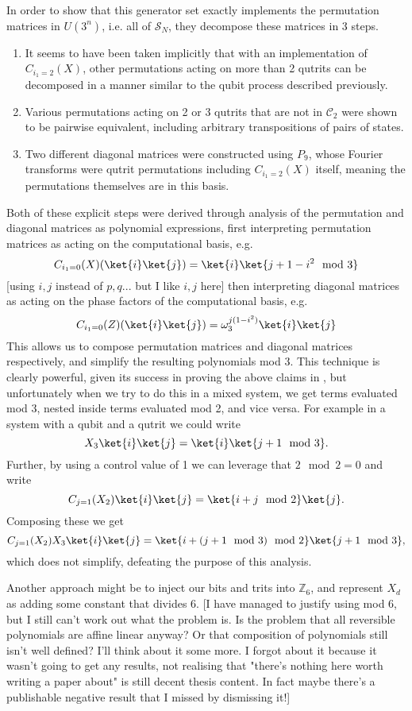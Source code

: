 In order to show that this generator set exactly implements the permutation matrices in $U\left(3^n\right)$, i.e. all of $\mathcal{S}_{N}$, they decompose these matrices in 3 steps.
\begin{enumerate}
	\item It seems to have been taken implicitly that with an implementation of $C_{i_1 = 2}(X)$, other permutations acting on more than 2 qutrits can be decomposed in a manner similar to the qubit process described previously.
	\item Various permutations acting on 2 or 3 qutrits that are not in $\mathcal{C}_2$ were shown to be pairwise equivalent, including arbitrary transpositions of pairs of states.
	\item Two different diagonal matrices were constructed using $P_9$, whose Fourier transforms were qutrit permutations including $C_{i_1=2}(X)$ itself, meaning the permutations themselves are in this basis.
\end{enumerate}

Both of these explicit steps were derived through analysis of the permutation and diagonal matrices as polynomial expressions, first interpreting permutation matrices as acting on the computational basis, e.g.
\[C_{i_1=0}(X)(\ket{i}\ket{j}) = \ket{i}\ket{j+1-i^2 \mod 3}\]
[using $i,j$ instead of $p,q$... but I like $i,j$ here] then interpreting diagonal matrices as acting on the phase factors of the computational basis, e.g.
\[C_{i_1=0}(Z)(\ket{i}\ket{j}) = \omega_{3}^{j(1-i^2)}\ket{i}\ket{j}\]
This allows us to compose permutation matrices and diagonal matrices respectively, and simplify the resulting polynomials mod 3. This technique is clearly powerful, given its success in proving the above claims in \cite{arithmetics}, but unfortunately when we try to do this in a mixed system, we get terms evaluated mod 3, nested inside terms evaluated mod 2, and vice versa. For example in a system with a qubit and a qutrit we could write
\[X_3\ket{i}\ket{j} = \ket{i}\ket{j+1\mod 3}.\]
Further, by using a control value of 1 we can leverage that $2 \mod 2 = 0$ and write
\[C_{j=1}(X_2)\ket{i}\ket{j} = \ket{i+j \mod 2}\ket{j}.\]
Composing these we get
\[C_{j=1}(X_2)X_3\ket{i}\ket{j} = \ket{i+(j+1 \mod 3)\mod 2}\ket{j + 1 \mod 3},\]
which does not simplify, defeating the purpose of this analysis. 

Another approach might be to inject our bits and trits into $\mathbb{Z}_6$, and represent $X_d$ as adding some constant that divides 6. [I have managed to justify using mod 6, but I still can't work out what the problem is. Is the problem that all reversible polynomials are affine linear anyway? Or that composition of polynomials still isn't well defined? I'll think about it some more. I forgot about it because it wasn't going to get any results, not realising that "there's nothing here worth writing a paper about" is still decent thesis content. In fact maybe there's a publishable negative result that I missed by dismissing it!]
